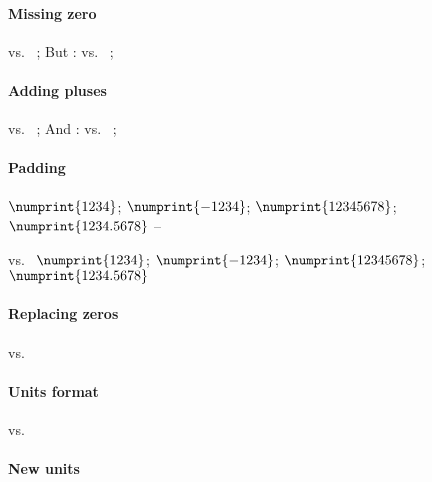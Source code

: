 \documentclass{article}
\begin{document}
\paragraph{Missing zero}
{\npnoaddmissingzero{}} vs.~ {\npaddmissingzero{}};
But : {\npnoaddmissingzero{}} vs.~ {\npaddmissingzero{}};

\paragraph{Adding pluses}
 vs.~ {\npaddplus{}};
And :  vs.~ {\npaddplusexponent{}};



\paragraph{Padding}
{%
 $\numprint{1234}$; $\numprint{-1234}$;
 $\numprint{12345678}$; $\numprint{1234.5678}$ --}

vs.~{%
 $\numprint{1234}$; $\numprint{-1234}$;
 $\numprint{12345678}$; $\numprint{1234.5678}$}

\paragraph{Replacing zeros}
  vs.~{\npreplacenull{\mbox{---}} }

\paragraph{Units format}
vs. {\renewcommand*\npunitcommand[1]{\ensuremath{\color{blue}\mathrm{#1}}}
 }

\paragraph{New units}
\end{document}
